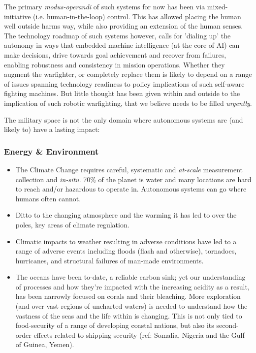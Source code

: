 \documentclass[11pt,letterpaper]{article}
\begin{document}
The primary \emph{modus-operandi} of such systems for now has been via
mixed-initiative (i.e. human-in-the-loop) control. This has allowed
placing the human well outside harms way, while also providing an
extension of the human senses. The technology roadmap of such systems
however, calls for 'dialing up' the autonomy in ways that embedded
machine intelligence (at the core of AI) can make decisions, drive
towards goal achievement and recover from failures, enabling
robustness and consistency in mission operations. Whether they augment
the warfighter, or completely replace them is likely to depend on a
range of issues spanning technology readiness to policy implications
of such self-aware fighting machines. But little thought has been
given within and outside \org to the implication of such robotic
warfighting, that we believe needs to be filled \emph{urgently}.

\pagebreak

The military space is not the only domain where autonomous systems are
(and likely to) have a lasting impact:

\subsubsection{Energy \& Environment}
\begin{itemize}

\item The Climate Change requires careful, systematic and
  \emph{at-scale} measurement collection and \emph{in-situ}. 70\% of
  the planet is water and many locations are hard to reach and/or
  hazardous to operate in. Autonomous systems can go where humans
  often cannot.

\item Ditto to the changing atmosphere and the warming it has led to
  over the poles, key areas of climate regulation.

\item Climatic impacts to weather resulting in adverse conditions have
  led to a range of adverse events including floods (flash and
  otherwise), tornadoes, hurricanes, and structural failures of man-made
  environments. 

\item The oceans have been to-date, a reliable carbon sink; yet our
  understanding of processes and how they're impacted with the
  increasing acidity as a result, has been narrowly focused on corals
  and their bleaching. More exploration (and over vast regions of
  uncharted waters) is needed to understand how the vastness of the
  seas and the life within is changing. This is not only tied to
  food-security of a range of developing coastal nations, but also its
  second-order effects related to shipping security (ref: Somalia,
  Nigeria and the Gulf of Guinea, Yemen).

\end{itemize}
\end{document}
